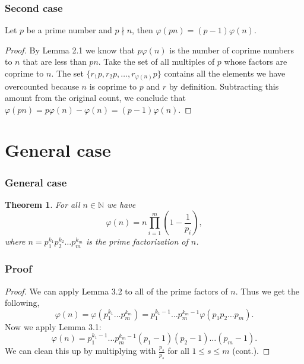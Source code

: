 \documentclass[envcountsect]{beamer}
\newtheorem*{theorem*}{Theorem}
\begin{document}
\begin{frame}
\frametitle{Second case}

\begin{lemma}
Let $p$ be a prime number and $p \nmid n$, then $\varphi(pn) = (p-1)\varphi(n)$.

\end{lemma}
\begin{proof}

By Lemma 2.1 we know that $p\varphi(n)$ is the number of coprime
numbers to $n$ that are less than $pn$. Take the set of all multiples of $p$ whose
factors are coprime to $n$. The set $\{r_1p,r_2p,\dots,r_{\varphi(n)}p\}$
contains all the elements we have overcounted because $n$ is coprime to $p$ and
$r$ by definition. Subtracting this amount from the original count, we conclude
that $\varphi(pn) =p\varphi(n) - \varphi(n) = (p-1)\varphi(n).$

\end{proof}

\end{frame}

\section{General case}

\begin{frame}
\frametitle{General case}

\begin{theorem*}
For all $n \in \mathbb{N}$ we have $$ \varphi(n) = n\prod_{i=1}^m
\left(1-\frac{1}{p_i}\right), $$ 
where $n = p_1^{k_1}p_2^{k_2}\dots p_m^{k_m} $ is the prime factorization of
$n$.
\end{theorem*}
\end{frame}

\begin{frame}
\frametitle{Proof}
\begin{proof}\renewcommand{\qedsymbol}{}
We can apply Lemma 3.2 to all of the prime factors of $n$. Thus we get the
following, 
$$ \varphi(n)=\varphi(p_1^{k_1} \dots p_m^{k_m}) =
p_1^{k_1-1} \dots p_m^{k_m-1}\varphi(p_1p_2 \dots p_m).$$
Now we apply Lemma 3.1:
$$ \varphi(n) = p_1^{k_1-1} \dots
p_m^{k_m-1}(p_1-1)(p_2-1)\dots(p_m-1). $$
We can clean this up by multiplying with $\frac{p_s}{p_s}$ for all $1 \leq s
\leq m$ (cont.).
\end{proof}

\end{frame}
\end{document}
